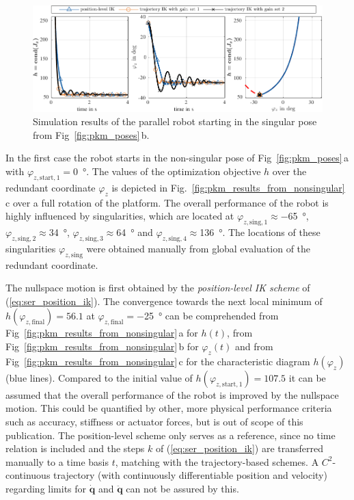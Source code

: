 \documentclass[a4paper,twoside]{article}
\begin{document}
\begin{figure}[tb]
	\includegraphics{figures/pkm_nullspace_case2_overview.pdf}
	\caption{Simulation results of the parallel robot starting in the singular pose from Fig~\ref{fig:pkm_poses}\,b.}
	\label{fig:pkm_results_from_singular}
\end{figure}

In the first case the robot starts in the non-singular pose of Fig~\ref{fig:pkm_poses}\,a with $\varphi_{z,\mathrm{start},1}{=}$\SI{0}{\degree}.
The values of the optimization objective $h$ over the redundant coordinate $\varphi_z$ is depicted in Fig.~\ref{fig:pkm_results_from_nonsingular}\,c over a full rotation of the platform.
The overall performance of the robot is highly influenced by singularities, which are located at $\varphi_{z,\mathrm{sing,1}}{\approx}$\SI{-65}{\degree}, $\varphi_{z,\mathrm{sing,2}}{\approx}$\SI{34}{\degree}, $\varphi_{z,\mathrm{sing,3}}{\approx}$\SI{64}{\degree} and $\varphi_{z,\mathrm{sing,4}}{\approx}$\SI{136}{\degree}.
The locations of these singularities $\varphi_{z,\mathrm{sing}}$ were obtained manually from global evaluation of the redundant coordinate.

The nullspace motion is first obtained by the \emph{position-level IK scheme} of (\ref{eq:ser_position_ik}).
The convergence towards the next local minimum of $h(\varphi_{z,\mathrm{final}}){=}56.1$ at $\varphi_{z,\mathrm{final}}{=}$\SI{-25}{\degree} can be comprehended from Fig~\ref{fig:pkm_results_from_nonsingular}\,a for $h(t)$, from Fig~\ref{fig:pkm_results_from_nonsingular}\,b for $\varphi_z(t)$ and from Fig~\ref{fig:pkm_results_from_nonsingular}\,c for the characteristic diagram $h(\varphi_z)$ (blue lines).
Compared to the initial value of $h(\varphi_{z,\mathrm{start},1}){=}107.5$ it can be assumed that the overall performance of the robot is improved by the nullspace motion.
This could be quantified by other, more physical performance criteria such as accuracy, stiffness or actuator forces, but is out of scope of this publication.
The position-level scheme only serves as a reference, since no time relation is included and the steps $k$ of (\ref{eq:ser_position_ik}) are transferred manually to a time basis $t$, matching with the trajectory-based schemes.
A $C^2$-continuous trajectory (with continuously differentiable position and velocity) regarding limits for $\dot{\bm{q}}$ and $\ddot{\bm{q}}$ can not be assured by this.
\end{document}
